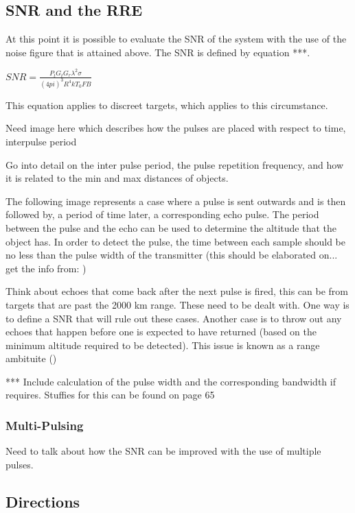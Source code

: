 \documentclass[11pt]{witseiepaper}
\begin{document}
\subsection{SNR and the RRE} \label{sec:SNRRRE}

At this point it is possible to evaluate the SNR of the system with the use of the noise figure that is attained above.
The SNR is defined by equation ***.

$SNR = \frac{P_{t} G_{t} G_{r} \lambda^2 \sigma}{(4 pi)^3 R^4 k T_0 F B}$

This equation applies to discreet targets, which applies to this circumstance.

Need image here which describes how the pulses are placed with respect to time, interpulse period

Go into detail on the inter pulse period, the pulse repetition frequency, and how it is related to the min and max distances of objects.

The following image represents a case where a pulse is sent outwards and is then followed by, a period of time later, a corresponding echo pulse.
The period between the pulse and the echo can be used to determine the altitude that the object has.
In order to detect the pulse, the time between each sample should be no less than the pulse width of the transmitter (this should be elaborated on... get the info from: \cite[p.~21]{radarHandbook})


Think about echoes that come back after the next pulse is fired, this can be from targets that are past the 2000 km range. These need to be dealt with. One way is to define a SNR that will rule out these cases. Another case is to throw out any echoes that happen before one is expected to have returned (based on the minimum altitude required to be detected). 
This issue is known as a range ambituite (\cite[p.~22]{radarHandbook})

*** Include calculation of the pulse width and the corresponding bandwidth if requires. Stuffies for this can be found on page 65




\subsubsection{Multi-Pulsing} \label{sec:MultiPulsing}

Need to talk about how the SNR can be improved with the use of multiple pulses.

\subsection{Directions} \label{sec:Directions}
\end{document}
